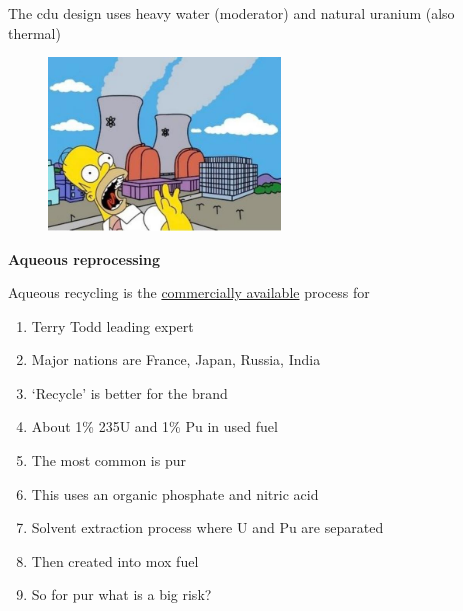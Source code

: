 \documentclass[aspectratio=1610,pdftex,dvipsnames,compress,xcolor={dvipsnames}]{beamer}
\newcommand{\acs}{\acrshort} %
\newcommand{\acsp}{\acrshortpl} %
\begin{document}
\begin{frame}{The \acs{cdu} design uses heavy water (moderator) and natural uranium (also thermal)}
    \begin{figure}
        \centering
        \includegraphics[width=0.55\textwidth]{simpsons.jpg}
    \end{figure}
\end{frame}


\begin{frame}[plain]{}
    \centering\LARGE\textbf{Aqueous reprocessing}
\end{frame}


\addtocounter{framenumber}{-1} 
\begin{frame}{Aqueous recycling is the \href{https://uidaho.pressbooks.pub/nuclearengineering/chapter/countercurrent-solvent-extraction/}{commercially available} process for \acsp{lwr}}
    \begin{enumerate}[series=outerlist,topsep=0pt,itemsep=18pt,leftmargin=*,label=(\arabic*)]
        \item[]Terry Todd leading expert
        \item[]Major nations are France, Japan, Russia, India
        \item[]`Recycle' is better for the brand
        \item[]About 1\% 235U and 1\% Pu in used fuel
        \item[]The most common is \acs{pur}
        \item[]This uses an organic phosphate and nitric acid
        \item[]Solvent extraction process where U and Pu are separated
        \item[]Then created into \acs{mox} fuel
        \item[]So for \acs{pur} what is a big risk?
    \end{enumerate}
\end{frame}
\end{document}
